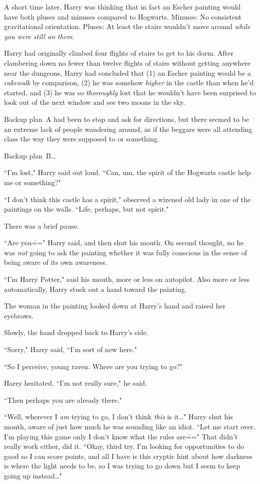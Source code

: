 A short time later, Harry was thinking that in fact an Escher painting would have both pluses and minuses compared to Hogwarts. Minuses: No consistent gravitational orientation. Pluses: At least the stairs wouldn't move around \emph{while you were still on them}.

Harry had originally climbed four flights of stairs to get to his dorm. After clambering down no fewer than twelve flights of stairs without getting anywhere near the dungeons, Harry had concluded that (1) an Escher painting would be a \emph{cakewalk} by comparison, (2) he was somehow \emph{higher} in the castle than when he'd started, and (3) he was so \emph{thoroughly} lost that he wouldn't have been surprised to look out of the next window and see two moons in the sky.

Backup plan~A had been to stop and ask for directions, but there seemed to be an extreme lack of people wandering around, as if the beggars were all attending class the way they were supposed to or something.

Backup plan~B{\ldots}

``I'm lost," Harry said out loud. ``Can, um, the spirit of the Hogwarts castle help me or something?"

``I don't think this castle has a spirit," observed a wizened old lady in one of the paintings on the walls. ``Life, perhaps, but not spirit."

There was a brief pause.

``Are you\===" Harry said, and then shut his mouth. On second thought, no he was \emph{not} going to ask the painting whether it was fully conscious in the sense of being aware of its own awareness.

``I'm Harry Potter," said his mouth, more or less on autopilot. Also more or less automatically, Harry stuck out a hand toward the painting.

The woman in the painting looked down at Harry's hand and raised her eyebrows.

Slowly, the hand dropped back to Harry's side.

``Sorry," Harry said, ``I'm sort of new here."

``So I perceive, young raven. Where are you trying to go?"

Harry hesitated. ``I'm not really sure," he said.

``Then perhaps you are already there."

``Well, wherever I \emph{am} trying to go, I don't think \emph{this} is it{\ldots}" Harry shut his mouth, aware of just how much he was sounding like an idiot. ``Let me start over. I'm playing this game only I don't know what the rules are\===" That didn't really work either, did it. ``Okay, third try. I'm looking for opportunities to do good so I can score points, and all I have is this cryptic hint about how darkness is where the light needs to be, so I was trying to go down but I seem to keep going up instead{\ldots}"


